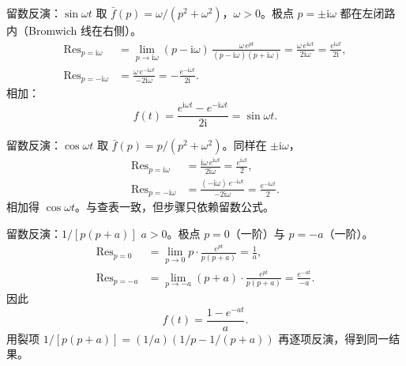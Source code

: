 \documentclass[fontset=windows, chinese, 10pt, xcolor=dvipsnames]{beamer}
\begin{document}
\begin{frame}{留数反演：$\sin\omega t$}
  取 $\bar f(p)=\omega/(p^2+\omega^2)$，$\omega>0$。极点
  $p=\pm\mathrm{i}\omega$ 都在左闭路内（Bromwich 线在右侧）。
  \begin{align*}
    \mathrm{Res}_{p=\mathrm{i}\omega}
    &=\lim_{p\to\mathrm{i}\omega}
      (p-\mathrm{i}\omega)\,
      \frac{\omega\,e^{pt}}{(p-\mathrm{i}\omega)(p+\mathrm{i}\omega)}
    =\frac{\omega\,e^{\mathrm{i}\omega t}}{2\mathrm{i}\omega}
    =\frac{e^{\mathrm{i}\omega t}}{2\mathrm{i}},\\[0.35em]
    \mathrm{Res}_{p=-\mathrm{i}\omega}
    &=\frac{\omega\,e^{-\mathrm{i}\omega t}}{-2\mathrm{i}\omega}
    =-\frac{e^{-\mathrm{i}\omega t}}{2\mathrm{i}}.
  \end{align*}
  相加：
  \begin{equation*}
    f(t)
    =\frac{e^{\mathrm{i}\omega t}-e^{-\mathrm{i}\omega t}}{2\mathrm{i}}
    =\sin\omega t.
  \end{equation*}
\end{frame}

\begin{frame}{留数反演：$\cos\omega t$}
  取 $\bar f(p)=p/(p^2+\omega^2)$。同样在 $\pm\mathrm{i}\omega$，
  \begin{align*}
    \mathrm{Res}_{p=\mathrm{i}\omega}
    &=\frac{\mathrm{i}\omega\,e^{\mathrm{i}\omega t}}{2\mathrm{i}\omega}
    =\frac{e^{\mathrm{i}\omega t}}{2},\\[0.35em]
    \mathrm{Res}_{p=-\mathrm{i}\omega}
    &=\frac{(-\mathrm{i}\omega)\,e^{-\mathrm{i}\omega t}}{-2\mathrm{i}\omega}
    =\frac{e^{-\mathrm{i}\omega t}}{2}.
  \end{align*}
  相加得 $\cos\omega t$。与查表一致，但步骤只依赖留数公式。
\end{frame}

\begin{frame}{留数反演：$1/[p(p+a)]$}
  $a>0$。极点 $p=0$（一阶）与 $p=-a$（一阶）。
  \begin{align*}
    \mathrm{Res}_{p=0}
    &=\lim_{p\to 0}p\cdot\frac{e^{pt}}{p(p+a)}
    =\frac{1}{a},\\[0.35em]
    \mathrm{Res}_{p=-a}
    &=\lim_{p\to -a}(p+a)\cdot\frac{e^{pt}}{p(p+a)}
    =\frac{e^{-at}}{-a}.
  \end{align*}
  因此
  \begin{equation*}
    f(t)=\frac{1-e^{-at}}{a}.
  \end{equation*}
  用裂项 $1/[p(p+a)]=(1/a)(1/p-1/(p+a))$ 再逐项反演，得到同一结果。
\end{frame}
\end{document}
